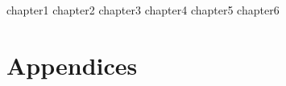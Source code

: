 \documentclass[12pt,a4paper]{report}
\begin{document}
\tableofcontents

{chapter1}
{chapter2}
{chapter3}
{chapter4}
{chapter5}
{chapter6}


\appendix
\chapter{Appendices}
\end{document}
